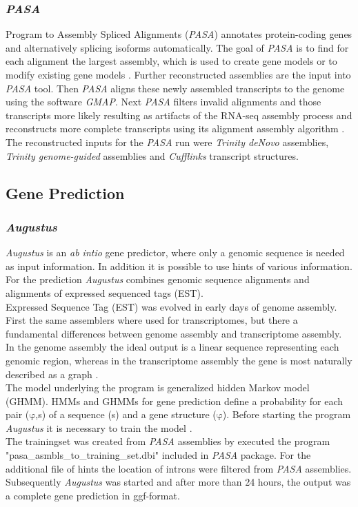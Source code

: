 \documentclass[12pt, a4paper]{report}
\begin{document}
\subsubsection*{\textit{PASA}}
Program to Assembly Spliced Alignments (\textit{PASA}) annotates protein-coding genes and alternatively splicing isoforms automatically. The goal of \textit{PASA} is to find for each alignment the largest assembly, which is used to create gene models or to modify existing gene models \cite{Haas2003}. 
Further reconstructed assemblies are the input into \textit{PASA} tool. Then \textit{PASA} aligns these newly assembled transcripts to the genome using the software \textit{GMAP}. Next \textit{PASA} filters invalid alignments and those transcripts more likely resulting as artifacts of the RNA-seq assembly process and reconstructs more complete transcripts using its alignment assembly algorithm \cite{Haas2011}. \\
The reconstructed inputs for the \textit{PASA} run were \textit{Trinity deNovo} assemblies, \textit{Trinity genome-guided} assemblies and \textit{Cufflinks} transcript structures. 

\subsection*{Gene Prediction}
\subsubsection{\textit{Augustus}}
\textit{Augustus} is an \textit{ab intio} gene predictor, where only a genomic sequence is needed as input information. In addition it is possible to use hints of various information. For the prediction \textit{Augustus} combines genomic sequence alignments and alignments of expressed sequenced tags (EST).\\
Expressed Sequence Tag (EST) was evolved in early days of genome assembly. First the same assemblers where used for transcriptomes, but there a fundamental differences between genome assembly and transcriptome assembly. In the genome assembly the ideal output is a linear sequence representing each genomic region, whereas in the transcriptome assembly the gene is most naturally described as a graph \cite{Korpelainen2014}.  \\
 The model underlying the program is generalized hidden Markov model (GHMM). HMMs and GHMMs for gene prediction define a probability for each pair ($\mathrm{\varphi}$,s) of a sequence (s) and a gene structure ($\mathrm{\varphi}$). Before starting the program \textit{Augustus} it is necessary to train the model \cite{Stanke2006}.  \\
The trainingset was created from \textit{PASA} assemblies by executed the program "pasa\_asmbls\_to\_training\_set.dbi" included in \textit{PASA} package. For the additional file of hints the location of introns were filtered from \textit{PASA} assemblies. Subsequently \textit{Augustus} was started and after more than 24 hours, the output was a complete gene prediction in ggf-format. 
\end{document}
